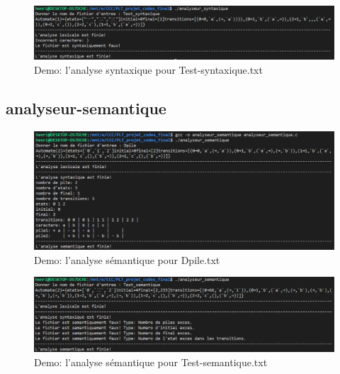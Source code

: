 \documentclass[a4paper,14pt,UTF8]{article}
\begin{document}
	\begin{figure}[H]
		\setlength{\abovecaptionskip}{-0.cm}
		
		\begin{center}
			\includegraphics[width=16cm]{syntaxique2}
		\end{center}
		\caption{Demo: l'analyse syntaxique pour Test-syntaxique.txt}
	\end{figure}
	
	\subsection{analyseur-semantique}
	
	\begin{figure}[H]
		\setlength{\abovecaptionskip}{-0.cm}
		
		\begin{center}
			\includegraphics[width=16cm]{semantique1}
		\end{center}
		\caption{Demo: l'analyse sémantique pour Dpile.txt}
	\end{figure}
	
	\begin{figure}[H]
		\setlength{\abovecaptionskip}{-0.cm}
		
		\begin{center}
			\includegraphics[width=16cm]{semantique2}
		\end{center}
		\caption{Demo: l'analyse sémantique pour Test-semantique.txt}
	\end{figure}
	
\end{document}
